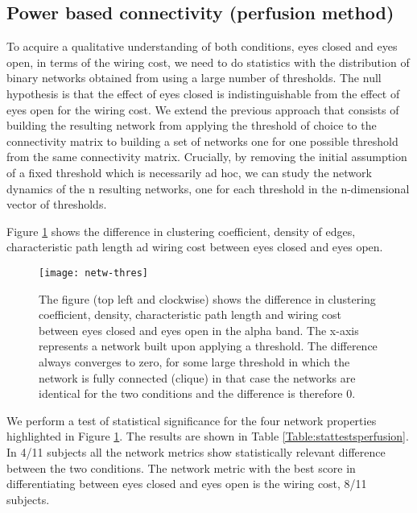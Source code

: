 \documentclass[11pt, onecolumn]{article}
\begin{document}
\subsection{Power based connectivity (perfusion method)}
\label{ss:perfusion}
To acquire a qualitative understanding of both conditions, eyes closed and eyes open, in terms of the wiring cost, we need to do statistics with the distribution of binary networks obtained from using a large number of thresholds.
The null hypothesis is that the effect of eyes closed is indistinguishable from the effect of eyes open for the wiring cost. We extend the previous approach that consists of building the resulting  network from applying the threshold of choice to the connectivity matrix to building a set of networks one for one possible threshold from the same connectivity matrix. Crucially, by removing the initial assumption of a fixed threshold which is necessarily ad hoc, we can study the network dynamics of the n resulting networks, one for each threshold in the n-dimensional vector of thresholds.

Figure \ref{fig:netw-thres} shows the difference in clustering coefficient, density of edges, characteristic path length ad wiring cost between eyes closed and eyes open.

\begin{figure}[H]
        \centering
        \texttt{[image: netw-thres]}
        \caption{The figure (top left and clockwise) shows the difference in clustering coefficient, density, characteristic path length and wiring cost between eyes closed and eyes open in the alpha band. The x-axis represents a network built upon applying a threshold. The difference always converges to zero, for some large threshold in which the network is fully connected (clique) in that case the networks are identical for the two conditions and the difference is therefore 0. }
\label{fig:netw-thres}
\end{figure}

We perform a test of statistical significance for the four network properties highlighted in Figure \ref{fig:netw-thres}. The results are shown in Table \ref{Table:stattestsperfusion}. In 4/11 subjects all the network metrics show statistically relevant difference between the two conditions. The network metric with the best score in differentiating between eyes closed and eyes open is the wiring cost, 8/11 subjects.
\end{document}
